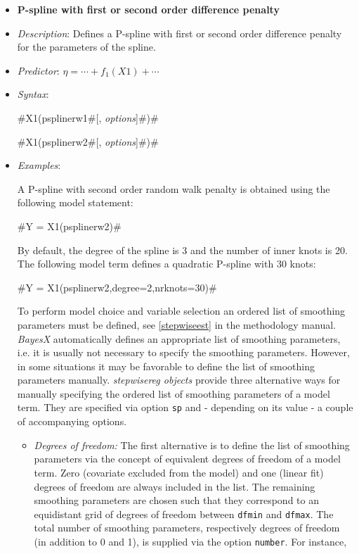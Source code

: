 \begin{itemize}
\item[] {\bf\sffamily P-spline with first or second order difference penalty}
\label{psplines_stepwise}

\item[] {\em Description}: Defines a P-spline with first or second
order difference penalty for the parameters of the spline.
\item[] {\em Predictor}: $\eta =  \cdots + f_1(X1) + \cdots$
\item[] {\em Syntax}:

#X1(psplinerw1#[, {\em options}]#)#

#X1(psplinerw2#[, {\em options}]#)#
\item[] {\em Examples}:

A P-spline with second order random walk penalty is
obtained using the following model statement:

#Y = X1(psplinerw2)#

By default, the degree of the spline is 3 and the number of inner
knots is 20. The following model term defines a quadratic P-spline
with 30 knots:

#Y = X1(psplinerw2,degree=2,nrknots=30)#

To perform model choice and variable selection an ordered list of smoothing parameters must be defined, see
\autoref{stepwiseest} in the methodology manual. {\em BayesX} automatically defines an appropriate list of smoothing
parameters, i.e. it is usually not necessary to  specify the smoothing parameters. However, in some situations it may be
favorable to define the list of smoothing parameters manually. {\em stepwisereg objects} provide three alternative ways for
manually specifying the ordered list of smoothing parameters of a model term. They are specified via option {\tt sp} and -
depending on its value - a couple of accompanying options.

\begin{itemize}
\item {\em Degrees of freedom:} The first alternative is to define the list of  smoothing parameters via the concept of
equivalent degrees of freedom of a model term. Zero (covariate excluded from the model) and one (linear fit)
degrees of freedom are always included in the list. The remaining smoothing parameters  are chosen such that they
correspond to an equidistant grid of degrees of freedom between {\tt dfmin} and {\tt dfmax}. The total
number of smoothing parameters, respectively degrees of freedom (in addition to 0 and 1), is supplied via the option {\tt number}.
For instance,


\end{itemize}
\end{itemize}
